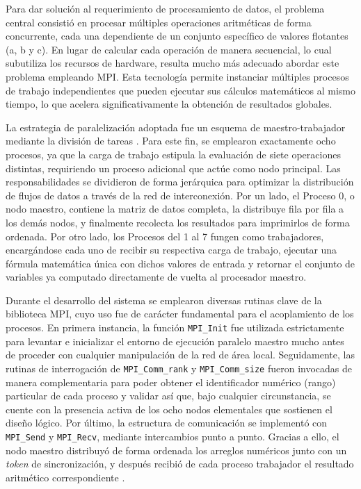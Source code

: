Para dar solución al requerimiento de procesamiento de datos, el problema central consistió en procesar múltiples operaciones aritméticas de forma concurrente, cada una dependiente de un conjunto específico de valores flotantes (a, b y c). En lugar de calcular cada operación de manera secuencial, lo cual subutiliza los recursos de hardware, resulta mucho más adecuado abordar este problema empleando MPI. Esta tecnología permite instanciar múltiples procesos de trabajo independientes que pueden ejecutar sus cálculos matemáticos al mismo tiempo, lo que acelera significativamente la obtención de resultados globales.

La estrategia de paralelización adoptada fue un esquema de maestro-trabajador mediante la división de tareas \cite{ref4_frem}. Para este fin, se emplearon exactamente ocho procesos, ya que la carga de trabajo estipula la evaluación de siete operaciones distintas, requiriendo un proceso adicional que actúe como nodo principal. Las responsabilidades se dividieron de forma jerárquica para optimizar la distribución de flujos de datos a través de la red de interconexión. Por un lado, el Proceso 0, o nodo maestro, contiene la matriz de datos completa, la distribuye fila por fila a los demás nodos, y finalmente recolecta los resultados para imprimirlos de forma ordenada. Por otro lado, los Procesos del 1 al 7 fungen como trabajadores, encargándose cada uno de recibir su respectiva carga de trabajo, ejecutar una fórmula matemática única con dichos valores de entrada y retornar el conjunto de variables ya computado directamente de vuelta al procesador maestro. 

Durante el desarrollo del sistema se emplearon diversas rutinas clave de la biblioteca MPI, cuyo uso fue de carácter fundamental para el acoplamiento de los procesos. En primera instancia, la función \texttt{MPI\_Init} fue utilizada estrictamente para levantar e inicializar el entorno de ejecución paralelo maestro mucho antes de proceder con cualquier manipulación de la red de área local. Seguidamente, las rutinas de interrogación de \texttt{MPI\_Comm\_rank} y \texttt{MPI\_Comm\_size} fueron invocadas de manera complementaria para poder obtener el identificador numérico (rango) particular de cada proceso y validar así que, bajo cualquier circunstancia, se cuente con la presencia activa de los ocho nodos elementales que sostienen el diseño lógico. Por último, la estructura de comunicación se implementó con \texttt{MPI\_Send} y \texttt{MPI\_Recv}, mediante intercambios punto a punto. Gracias a ello, el nodo maestro distribuyó de forma ordenada los arreglos numéricos junto con un \textit{token} de sincronización, y después recibió de cada proceso trabajador el resultado aritmético correspondiente \cite{ref7_frem}.

